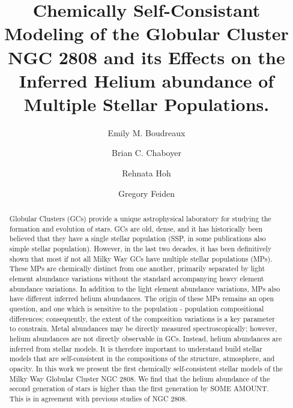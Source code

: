 \documentclass[twocolumn,linenumbers]{src/aastex631}
\begin{document}
\title{Chemically Self-Consistant Modeling of the Globular Cluster NGC 2808 and its Effects on the Inferred Helium abundance of Multiple Stellar Populations.}


\author[0000-0002-2600-7513]{Emily M. Boudreaux}

\author[0000-0003-3096-4161]{Brian C. Chaboyer}

\author{Rehnata Hoh}

\author[0000-0002-2012-7215]{Gregory Feiden}


\begin{abstract}
	Globular Clusters (GCs) provide a unique astrophysical laboratory for
	studying the formation and evolution of stars. GCs are old, dense, and it
	has historically been believed that they have a single stellar population
	(SSP, in some publications also simple stellar population). However, in the
	last two decades, it has been definitively shown that most if not all Milky
	Way GCs have multiple stellar populations (MPs). These MPs are chemically
	distinct from one another, primarily separated by light element abundance
	variations without the standard accompanying heavy element abundance
	variations. In addition to the light element abundance variations, MPs also
	have different inferred helium abundances. The origin of these MPs remains
	an open question, and one which is sensitive to the population - population
	compositional differences; consequently, the extent of the composition
	variations is a key parameter to constrain. Metal abundances may be
	directly measured spectroscopically; however, helium abundances are not
	directly observable in GCs. Instead, helium abundances are inferred from
	stellar models. It is therefore important to understand build stellar
	models that are self-consistent in the compositions of the structure,
	atmosphere, and opacity. In this work we present the first chemically
	self-consistent stellar models of the Milky Way Globular Cluster NGC 2808.
	We find that the helium abundance of the second generation of stars is
	higher than the first generation by {\color{red} SOME AMOUNT}.
	{\color{blue} This is in agreement with previous studies of NGC 2808.}
\end{abstract}
\end{document}
